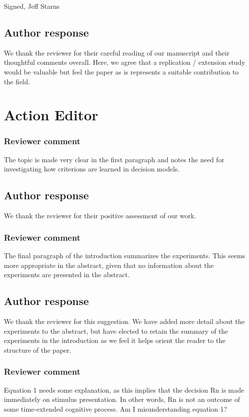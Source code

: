 \documentclass[12pt]{article}
\begin{document}
Signed,
Jeff Starns

\subsection{Author response}
We thank the reviewer for their careful reading of our
manuscript and their thoughtful comments overall. Here, we
agree that a replication / extension study would be valuable
but feel the paper as is represents a suitable contribution
to the field.

\section*{Action Editor}

\subsubsection{Reviewer comment}
The topic is made very clear in the first paragraph and
notes the need for investigating how criterions are learned
in decision models.

\subsection{Author response}
We thank the reviewer for their positive assessment of our
work.

\subsubsection{Reviewer comment}
The final paragraph of the introduction summarizes the
experiments. This seems more appropriate in the abstract,
given that no information about the experiments are
presented in the abstract.

\subsection{Author response}
We thank the reviewer for this suggestion. We have added
more detail about the experiments to the abstract, but have
elected to retain the summary of the experiments in the
introduction as we feel it helps orient the reader to the
structure of the paper.

\subsubsection{Reviewer comment}
Equation 1 needs some explanation, as this implies that the
decision Rn is made immediately on stimulus presentation. In
other words, Rn is not an outcome of some time-extended
cognitive process. Am I misunderstanding equation 1?
\end{document}
